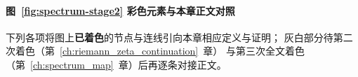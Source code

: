 \clearpage
\begin{figure}[p]
\centering
\def\spectrumStage{2}
\resizebox{\textwidth}{!}{%
%
}
\end{figure}
\clearpage
\noindent
{}
\label{fig:spectrum-stage2}

\paragraph{图~\ref{fig:spectrum-stage2} 彩色元素与本章正文对照}
下列各项将图上\textbf{已着色}的节点与连线引向本章相应定义与证明；
灰白部分待第二次着色（第~\ref{ch:riemann_zeta_continuation}~章）
与第三次全文着色（第~\ref{ch:spectrum_map}~章）后再逐条对接正文。

